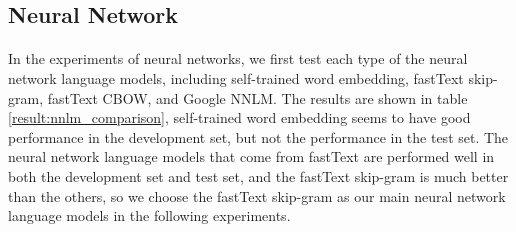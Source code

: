 \documentclass{article}
\begin{document}
\begin{CJK*}{UTF8}{bkai}

\subsection{Neural Network}
\paragraph{}
In the experiments of neural networks, we first test each type of the neural network language models, including self-trained word embedding, fastText skip-gram, fastText CBOW, and Google NNLM. The results are shown in table \ref{result:nnlm_comparison}, self-trained word embedding seems to have good performance in the development set, but not the performance in the test set. The neural network language models that come from fastText are performed well in both the development set and test set, and the fastText skip-gram is much better than the others, so we choose the fastText skip-gram as our main neural network language models in the following experiments.


\end{CJK*}
\end{document}
